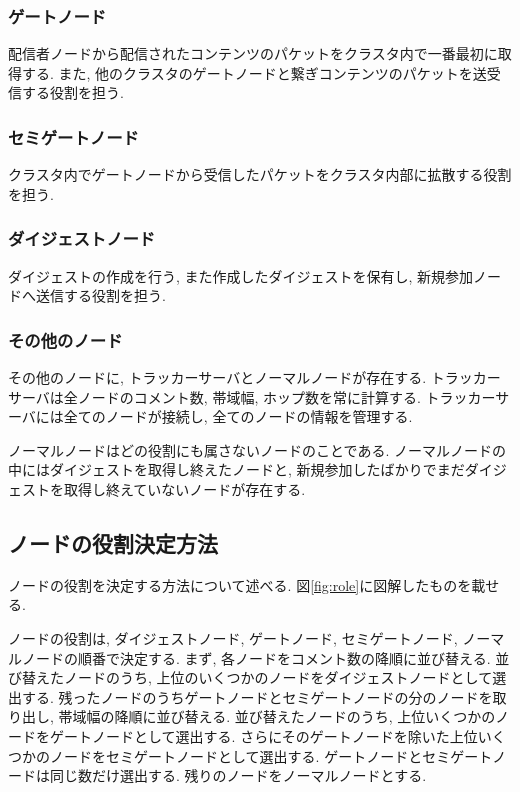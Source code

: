 \subsubsection{ゲートノード}
配信者ノードから配信されたコンテンツのパケットをクラスタ内で一番最初に取得する. また, 他のクラスタのゲートノードと繋ぎコンテンツのパケットを送受信する役割を担う.

\subsubsection{セミゲートノード}
クラスタ内でゲートノードから受信したパケットをクラスタ内部に拡散する役割を担う.

\subsubsection{ダイジェストノード}
ダイジェストの作成を行う, また作成したダイジェストを保有し, 新規参加ノードへ送信する役割を担う.

\subsubsection{その他のノード}
その他のノードに, トラッカーサーバとノーマルノードが存在する. トラッカーサーバは全ノードのコメント数, 帯域幅, ホップ数を常に計算する. トラッカーサーバには全てのノードが接続し, 全てのノードの情報を管理する.

ノーマルノードはどの役割にも属さないノードのことである. ノーマルノードの中にはダイジェストを取得し終えたノードと, 新規参加したばかりでまだダイジェストを取得し終えていないノードが存在する.

\subsection{ノードの役割決定方法}
ノードの役割を決定する方法について述べる. 図\ref{fig:role}に図解したものを載せる.

ノードの役割は, ダイジェストノード, ゲートノード, セミゲートノード, ノーマルノードの順番で決定する. まず, 各ノードをコメント数の降順に並び替える. 並び替えたノードのうち, 上位のいくつかのノードをダイジェストノードとして選出する. 残ったノードのうちゲートノードとセミゲートノードの分のノードを取り出し, 帯域幅の降順に並び替える. 並び替えたノードのうち, 上位いくつかのノードをゲートノードとして選出する. さらにそのゲートノードを除いた上位いくつかのノードをセミゲートノードとして選出する. ゲートノードとセミゲートノードは同じ数だけ選出する. 残りのノードをノーマルノードとする.

